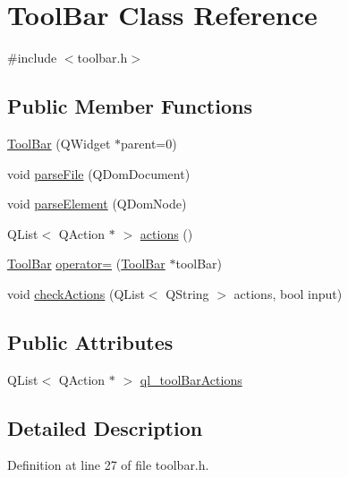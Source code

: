 \hypertarget{classToolBar}{
\section{ToolBar Class Reference}
\label{classToolBar}
}


{\ttfamily \#include $<$toolbar.h$>$}

\subsection*{Public Member Functions}
\begin{DoxyCompactItemize}
\item 
\hyperlink{classToolBar_a0e91aa2fa144d6e3d955001546853219}{ToolBar} (QWidget $\ast$parent=0)
\item 
void \hyperlink{classToolBar_a81d36baf8277208e5c005c308bd8abe6}{parseFile} (QDomDocument)
\item 
void \hyperlink{classToolBar_a137568307b107b2ec26060732fed1229}{parseElement} (QDomNode)
\item 
QList$<$ QAction $\ast$ $>$ \hyperlink{classToolBar_abcf118e71635d09835637203705e5e1c}{actions} ()
\item 
\hyperlink{classToolBar}{ToolBar} \hyperlink{classToolBar_a35b790cf13f6bd45422a5c64f2a83afc}{operator=} (\hyperlink{classToolBar}{ToolBar} $\ast$toolBar)
\item 
void \hyperlink{classToolBar_a96857615bc3c32af5e240a73ad5b150e}{checkActions} (QList$<$ QString $>$ actions, bool input)
\end{DoxyCompactItemize}
\subsection*{Public Attributes}
\begin{DoxyCompactItemize}
\item 
QList$<$ QAction $\ast$ $>$ \hyperlink{classToolBar_a1bf2617269764c907e69d6ff8492a041}{ql\_\-toolBarActions}
\end{DoxyCompactItemize}


\subsection{Detailed Description}


Definition at line 27 of file toolbar.h.



